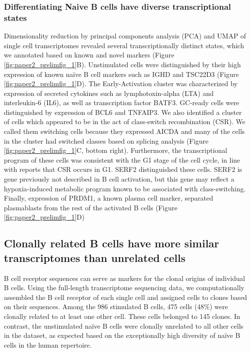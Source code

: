 \subsubsection{Differentiating Naive B cells have diverse transcriptional states}

Dimensionality reduction by principal components analysis (PCA) and UMAP\cite{mcinnes_umap_2018} of single cell transcriptomes revealed several transcriptionally distinct states, which we annotated based on known and novel markers  (Figure \ref{fig:paper2_prelimfig_1}B). Unstimulated cells were distinguished by their high expression of known naïve B cell markers such as IGHD and TSC22D3 (Figure \ref{fig:paper2_prelimfig_1}D). The Early-Activation cluster was characterized by expression of secreted cytokines such as lymphotoxin-alpha (LTA) and interleukin-6 (IL6), as well as transcription factor BATF3. GC-ready cells were distinguished by expression of BCL6 and TNFAIP3. We also identified a cluster of cells which appeared to be in the act of class-switch recombination (CSR). We called them switching cells because they expressed AICDA and many of the cells in the cluster had switched classes based on splicing analysis (Figure \ref{fig:paper2_prelimfig_1}C, bottom right). Furthermore, the transcriptional program of these cells was consistent with the G1 stage of the cell cycle, in line with reports that CSR occurs in G1\cite{abbott2016germinal}. SERF2 distinguished these cells. SERF2 is gene previously not described in B cell activation, but this gene may reflect a hypoxia-induced metabolic program known to be associated with class-switching\cite{abbott2016germinal}. Finally, expression of PRDM1, a known plasma cell marker, separated plasmablasts from the rest of the activated B cells  (Figure \ref{fig:paper2_prelimfig_1}D) 


\subsection{Clonally related B cells have more similar transcriptomes than unrelated cells}
B cell receptor sequences can serve as markers for the clonal origins of individual B cells. Using the full-length transcriptome sequencing data, we computationally assembled the B cell receptor of each single cell and assigned cells to clones based on their sequences. Among the 986 stimulated B cells, 475 cells (48\%) were clonally related to at least one other cell. These cells belonged to 145 clones. In contrast, the unstimulated naïve B cells were clonally unrelated to all other cells in the dataset, as expected based on the exceptionally high diversity of naïve B cells in the human repertoire\cite{briney2019commonality}.

